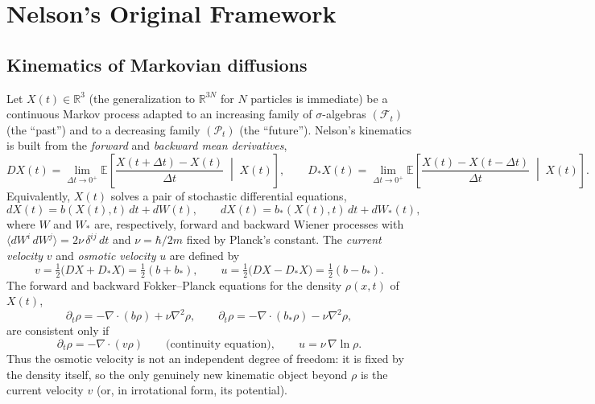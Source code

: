 \documentclass[11pt]{article}
\newcommand{\E}{\mathbb{E}}
\newcommand{\R}{\mathbb{R}}
\begin{document}
\section{Nelson's Original Framework}\label{sec:framework}

\subsection{Kinematics of Markovian diffusions}

Let $X(t)\in\R^{3}$ (the generalization to $\R^{3N}$ for $N$ particles is
immediate) be a continuous Markov process adapted to an increasing family
of $\sigma$-algebras $(\mathcal F_t)$ (the ``past'') and to a decreasing
family $(\mathcal P_t)$ (the ``future''). Nelson's kinematics is built from
the \emph{forward} and \emph{backward mean derivatives},
\begin{equation}
DX(t) = \lim_{\Delta t\to 0^+}\E\!\left[\frac{X(t+\Delta t)-X(t)}{\Delta t}\;\middle|\;X(t)\right], \qquad
D_*X(t) = \lim_{\Delta t\to 0^+}\E\!\left[\frac{X(t)-X(t-\Delta t)}{\Delta t}\;\middle|\;X(t)\right].
\end{equation}
Equivalently, $X(t)$ solves a pair of stochastic differential equations,
\begin{equation}
dX(t) = b(X(t),t)\,dt + dW(t), \qquad dX(t) = b_*(X(t),t)\,dt + dW_*(t),
\end{equation}
where $W$ and $W_*$ are, respectively, forward and backward Wiener
processes with $\langle dW^i\,dW^j\rangle = 2\nu\,\delta^{ij}\,dt$ and
$\nu = \hbar/2m$ fixed by Planck's constant. The \emph{current velocity}
$v$ and \emph{osmotic velocity} $u$ are defined by
\begin{equation}
v = \tfrac12\big(DX+D_*X\big) = \tfrac12(b+b_*), \qquad
u = \tfrac12\big(DX-D_*X\big) = \tfrac12(b-b_*).
\end{equation}
The forward and backward Fokker--Planck equations for the density $\rho(x,t)$ of $X(t)$,
\begin{equation}
\partial_t\rho = -\nabla\!\cdot(b\rho)+\nu\nabla^2\rho, \qquad \partial_t\rho = -\nabla\!\cdot(b_*\rho)-\nu\nabla^2\rho,
\end{equation}
are consistent only if
\begin{equation}\label{eq:osmotic}
\partial_t \rho = -\nabla\!\cdot(v\rho) \qquad\text{(continuity equation)}, \qquad u = \nu\,\nabla\ln\rho.
\end{equation}
Thus the osmotic velocity is not an independent degree of freedom: it is
fixed by the density itself, so the only genuinely new kinematic object
beyond $\rho$ is the current velocity $v$ (or, in irrotational form, its
potential).
\end{document}
